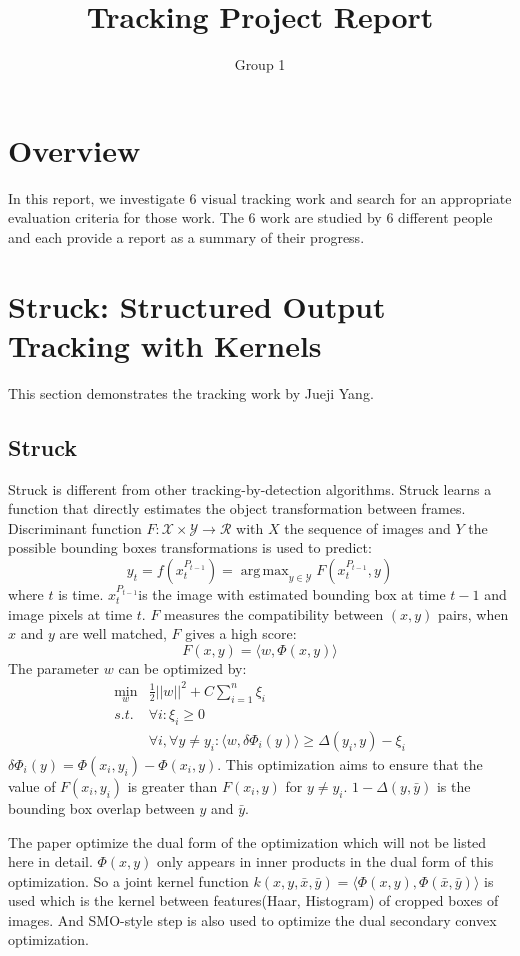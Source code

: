 \documentclass{article}
\title{Tracking Project Report}
\author{Group 1}
\DeclareMathOperator*{\argmax}{arg\,max}
\DeclareMathOperator*{\minbelow}{min}
\begin{document}
\maketitle


\section{Overview}

In this report, we investigate 6 visual tracking work and search for an appropriate evaluation criteria for those work. The 6 work are studied by 6 different people and each provide a report as a summary of their progress.


\section{Struck: Structured Output Tracking with Kernels}
This section demonstrates the tracking work by Jueji Yang.

\subsection{Struck}
Struck\cite{struck} is different from other tracking-by-detection algorithms. Struck learns a function that directly estimates the object transformation between frames. Discriminant function $F:\mathcal{X} \times \mathcal{Y} \to \mathcal{R}$ with $X$ the sequence of images and $Y$ the possible bounding boxes transformations is used to predict:
\[
y_t = f(x_t^{P_{t-1}}) = \argmax_{y\in \mathcal{Y}}F(x_t^{P_{t-1}},y)
\]
where $t$ is time. $x_t^{P_{t-1}}$is the image with estimated bounding box at time $t-1$ and image pixels at time $t$. $F$ measures the compatibility between $(x,y)$ pairs, when $x$ and $y$ are well matched, $F$ gives a high score:
\[
F(x,y)=\langle w, \Phi(x,y) \rangle
\]
The parameter $w$ can be optimized by:
\begin{align}
\minbelow_w	&\frac{1}{2}||w||^2 + C \sum_{i=1}^n\xi_i\nonumber\\
	s.t.	&\forall i: \xi_i \ge 0\nonumber\\
			&\forall i, \forall y\not= y_i : \langle w, \delta\Phi_i(y)\rangle \ge \Delta(y_i,y)-\xi_i
\end{align}
$\delta\Phi_i(y)=\Phi(x_i, y_i) - \Phi(x_i, y)$. This optimization aims to ensure that the value of $F(x_i, y_i)$ is greater than $F(x_i, y)$ for $y\not= y_i$. $1-\Delta(y,\bar{y})$ is the bounding box overlap between $y$ and $\bar{y}$.

The paper optimize the dual form of the optimization which will not be listed here in detail. $\Phi(x,y)$ only appears in inner products in the dual form of this optimization. So a joint kernel function $k(x,y,\bar{x},\bar{y}) = \langle \Phi(x,y), \Phi(\bar{x},\bar{y})\rangle$ is used which is the kernel between features(Haar, Histogram) of cropped boxes of images. And SMO-style step is also used to optimize the dual secondary convex optimization.
\end{document}
